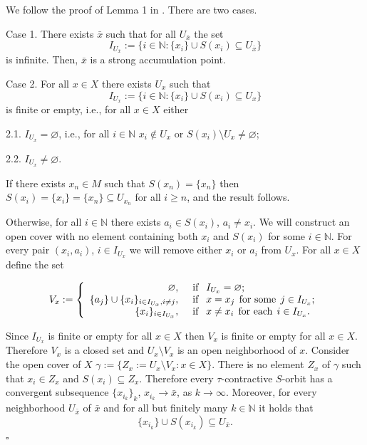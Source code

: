 \documentclass{article}
\renewcommand{\emptyset}{\varnothing}
\def\text#1{\,\;\hbox{#1}\;\,}
\newcommand{\N}{\mathbb{N}}
\renewenvironment{proof}
         {\begin{trivlist}\item[
         {\bf Proof.}]}{{\hfill $\square$} \end{trivlist}}
\begin{document}
\begin{proof}
We follow the proof of Lemma 1 in \cite{Kupka}. There are two cases.

\smallskip

Case 1. There exists $\bar{x}$ such that for all $U_{\bar{x}}$ the set 
\[I_{U_{\bar{x}}}:=\{i \in \N: \{x_i\} \cup S(x_i) \subseteq U_{\bar{x}}\}\]
is infinite. Then, $\bar{x}$ is a strong accumulation point.

\smallskip

Case 2. For all $x \in X$ there exists $U_{x}$ such that
\[I_{U_{x}}:=\{i \in \N: \{x_i\} \cup S(x_i) \subseteq U_{x}\}\]
is finite or empty, i.e., for all $x \in X$ either

\smallskip

2.1. $I_{U_{x}}=\emptyset$, i.e., for all $i \in \N$ $x_i \notin U_{x}$ or $S(x_i) \setminus U_x \neq \emptyset$;

2.2. $I_{U_{x}} \neq \emptyset$. 

If there exists $x_n \in M$ such that $S(x_n)=\{x_n\}$ then $S(x_i)=\{x_i\}=\{x_n\} \subseteq U_{x_n}$ for all $i \geq n$, and the result follows.

Otherwise, for all $i \in \N$ there exists $a_i \in S(x_i)$, $a_i \neq x_i$. We will construct an open cover with no element containing both $x_i$ and $S(x_i)$ for some $i \in \N$. For every pair $(x_i, a_i)$, $i \in I_{U_x}$ we will remove either $x_i$ or $a_i$ from $U_x$. For all $x \in X$ define the set

\[V_x:=\left \{\begin{array}{rl} \emptyset, & \text{if } I_{U_x}=\emptyset;  \\
\{a_j\}\cup\{x_i\}_{i \in I_{U_x}, i \neq j}, & \text{if } x = x_j \text{for some} j \in I_{U_x}; \\
\{x_i\}_{i \in I_{U_x}}, & \text{if } x \neq x_i \text{for each} i \in I_{U_x}. \\
\end{array}\right.\]

Since $I_{U_x}$ is finite or empty for all $x \in X$ then $V_x$ is finite or empty for all $x \in X$. Therefore $V_x$ is a closed set and $U_x \setminus V_x$ is an open neighborhood of $x$. Consider the open cover of $X$ $\gamma:=\{Z_x:=U_x \setminus V_x: x \in X\}$. There is no element $Z_x$ of $\gamma$ such that $x_i \in Z_x$ and $S(x_i) \subseteq Z_x$. Therefore every $\tau$-contractive $S$-orbit has a convergent subsequence $\{x_{i_k}\}_k$, $x_{i_k} \rightarrow \bar{x}$, as $k \rightarrow \infty$. Moreover, for every neighborhood $U_{\bar{x}}$ of $\bar{x}$ and for all but finitely many $k \in \N$ it holds that 
$$ 
\{x_{i_k}\} \cup S(x_{i_k}) \subseteq U_{\bar{x}}.
$$
\end{proof}
\end{document}
